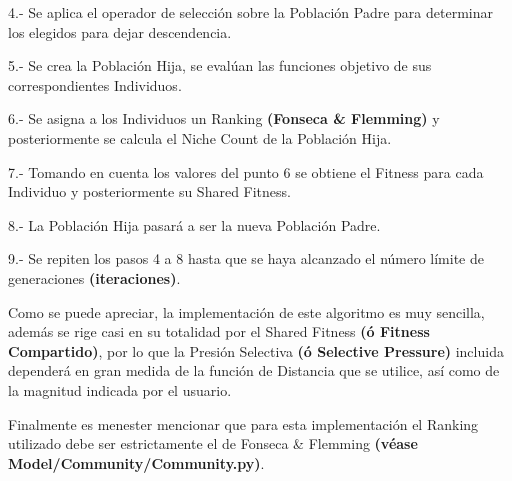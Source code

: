 \documentclass[letterpaper,10pt,english]{sphinxmanual}
\begin{document}
\begin{DUlineblock}{0em}
\item[] 4.- Se aplica el operador de selección sobre la Población Padre para determinar los elegidos para dejar descendencia.
\end{DUlineblock}

\begin{DUlineblock}{0em}
\item[] 5.- Se crea la Población Hija, se evalúan las funciones objetivo de sus correspondientes Individuos.
\end{DUlineblock}

\begin{DUlineblock}{0em}
\item[] 6.- Se asigna a los Individuos un Ranking \textbf{(Fonseca \& Flemming)} y posteriormente se calcula el Niche Count de la Población Hija.
\end{DUlineblock}

\begin{DUlineblock}{0em}
\item[] 7.- Tomando en cuenta los valores del punto 6 se obtiene el Fitness para cada Individuo y posteriormente su Shared Fitness.
\end{DUlineblock}

\begin{DUlineblock}{0em}
\item[] 8.- La Población Hija pasará a ser la nueva Población Padre.
\end{DUlineblock}

\begin{DUlineblock}{0em}
\item[] 9.- Se repiten los pasos 4 a 8 hasta que se haya alcanzado el número límite de generaciones \textbf{(iteraciones)}.
\item[] 
\item[] Como se puede apreciar, la implementación de este algoritmo es muy sencilla, además
se rige casi en su totalidad por el Shared Fitness \textbf{(ó Fitness Compartido)}, por lo
que la Presión Selectiva \textbf{(ó Selective Pressure)} incluida dependerá en gran medida
de la función de Distancia que se utilice, así como de la magnitud indicada por
el usuario.
\item[] 
\item[] Finalmente es menester mencionar que para esta implementación el Ranking utilizado debe ser
estrictamente el de Fonseca \& Flemming \textbf{(véase Model/Community/Community.py)}.
\end{DUlineblock}
\label{Model/MOEA/MOGA:module-Model.MOEA.MOGA}
\end{document}
